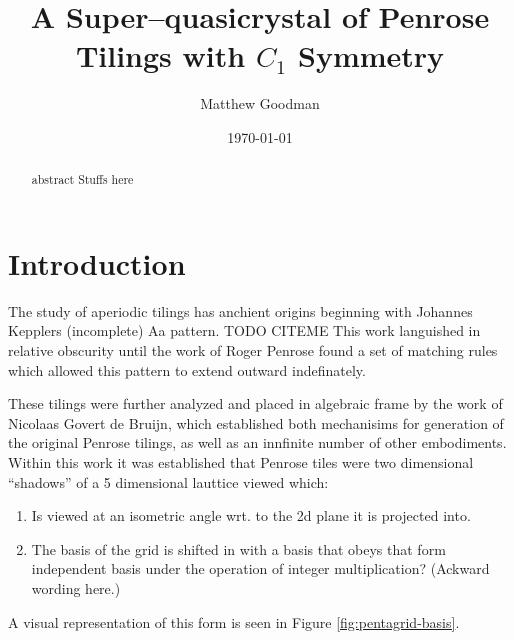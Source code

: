 \documentclass{amsart}
\begin{document}
\title{A Super--quasicrystal of Penrose Tilings with $C_1$ Symmetry}
\author[MR Goodman]{Matthew Goodman}
\address{3Scan \\ 2122 Bryant \\ San Francisco CA, 94110}

\date{\today}

\begin{abstract}
	abstract Stuffs here
\end{abstract}

\maketitle

\section{Introduction}
The study of aperiodic tilings has anchient origins beginning with Johannes Kepplers (incomplete) Aa
pattern. TODO CITEME  This work languished in relative obscurity until the work of Roger Penrose\cite{penrose1979set, penrose1979pentaplexity} found a set of matching rules which allowed this pattern to extend outward 
indefinately.

These tilings were further analyzed and placed in algebraic frame by the work of 
Nicolaas Govert de Bruijn, which established both mechanisims for generation of the 
original Penrose tilings, as well as an innfinite number of other embodiments.\cite{de1981algebraic1, de1981algebraic2}
Within this work it was established that Penrose tiles were two dimensional ``shadows'' of
a 5 dimensional lauttice viewed which:
\begin{enumerate}
	\item Is viewed at an isometric angle wrt. to the 2d plane it is projected into.
	\item The basis of the grid is shifted in with a basis that obeys that form independent
	basis under the operation of integer multiplication? (Ackward wording here.) 
\end{enumerate}

A visual representation of this form is seen in Figure \ref{fig:pentagrid-basis}.
\end{document}
